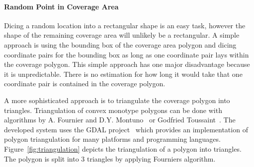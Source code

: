 \paragraph{Random Point in Coverage Area}
Dicing a random location into a rectangular shape is an easy task, however the shape of the remaining coverage area will unlikely be a rectangular. A simple approach is using the bounding box of the coverage area polygon and dicing coordinate pairs for the bounding box as long as one coordinate pair lays within the coverage polygon. This simple approach has one major disadvantage because it is unpredictable. There is no estimation for how long it would take that one coordinate pair is contained in the coverage polygon.

A more sophisticated approach is to triangulate the coverage polygon into triangles. Triangulation of convex monotype polygons can be done with algorithms by  A. Fournier and D.Y. Montuno~\cite{Fournier1984} or Godfried Toussaint~\cite{Toussaint1984}. The developed system uses the GDAL project~\cite{GDAL} which provides an implementation of polygon triangulation for many platforms and programming languages.
Figure~\ref{fig:triangulation} depicts the triangulation of a polygon into triangles. The polygon is split into 3 triangles by applying Fourniers algorithm.

